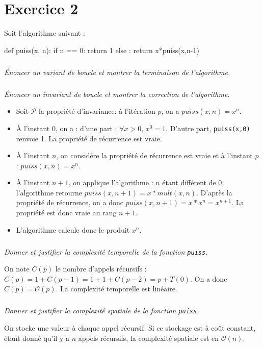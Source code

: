 \section*{Exercice 2}
\setcounter{subparagraph}{0}

Soit l'algorithme suivant : 

\begin{py}
\begin{python}
def puiss(x, n):
    if n == 0:
        return 1
    else :
        return x*puiss(x,n-1)
\end{python}
\end{py}

\subparagraph{}
\textit{Énoncer un variant de boucle et montrer la terminaison de l'algorithme.}

\subparagraph{}
\textit{Énoncer un invariant de boucle et montrer la correction de l'algorithme.}
\ifprof
\begin{corrige}
\begin{itemize}
\item Soit $\mathcal{P}$ la propriété d'invariance: à l'itération $p$, on a $puiss(x,n)=x^n$. 
\item À l'instant 0, on a : d'une part : $\forall x>0$, $x^0 = 1$. D'autre part, \texttt{puiss(x,0)} renvoie 1. La 
propriété de récurrence est vraie. 
\item À l'instant $n$, on considère la propriété de récurrence est vraie et à l'instant $p$ : $puiss(x,n)=x^n$.
\item À l'instant $n+1$, on applique l'algorithme : $n$ étant différent de 0, l'algorithme retourne 
$puiss(x,n+1)=x*mult(x,n)$. D'après la propriété de récurrence, on a donc $puiss(x,n+1)=x*x^n=x^{n+1} $. La propriété 
est donc vraie au rang $n+1$.
\item L'algorithme calcule donc le produit $x^n$.
\end{itemize}   
\end{corrige}
\else
\fi
\subparagraph{}
\textit{Donner et justifier la complexité temporelle de la fonction \texttt{puiss}.}
\ifprof
\begin{corrige}
On note $C(p)$ le nombre d'appels récursifs : $C(p) = 1+C(p-1) = 1+1+C(p-2)=p+T(0)$. On a donc $C(p)=\mathcal{O}(p)$. La 
complexité temporelle est linéaire.
\end{corrige}
\else
\fi

\subparagraph{}
\textit{Donner et justifier la complexité spatiale de la fonction \texttt{puiss}.}
\ifprof
\begin{corrige}
On stocke une valeur à chaque appel récursif. Si ce stockage est à coût constant, étant donné qu'il y a $n$ appels 
récursifs, la complexité spatiale est en $\mathcal{O}(n)$.
\end{corrige}
\else
\fi



